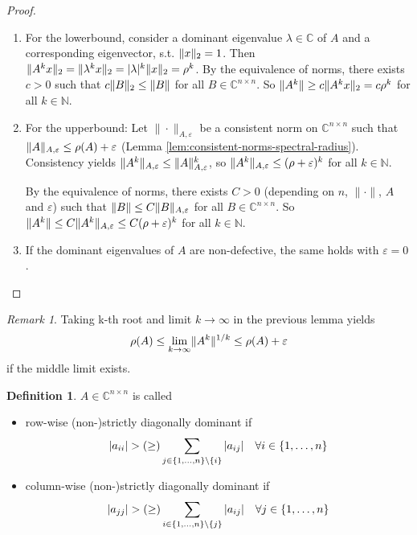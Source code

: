 \documentclass[12pt]{article}
\theoremstyle{definition}
\newtheorem{definition}[theorem]{Definition}
\theoremstyle{remark}
\newtheorem*{remark*}{Remark}
\numberwithin{equation}{section}
\newcommand{\C}{\mathbb{C}}
\newcommand{\N}{\mathbb{N}}
\newcommand{\normempty}{\|\cdot\|}
\DeclarePairedDelimiter{\norm}{\lVert}{\rVert}
\DeclarePairedDelimiter{\set}{\{}{\}}
\begin{document}
\begin{proof}
  \begin{enumerate}[label={(\roman*)}]
    \item For the lowerbound, consider a dominant eigenvalue $\lambda \in \C$ of $A$ and a corresponding eigenvector, s.t. $\norm{x}_2 = 1$. Then $\norm{A^kx}_2 = \norm{\lambda^k x}_2 = |\lambda|^k \norm{x}_2 = \rho^k$. By the equivalence of norms, there exists $c>0$ such that $c \norm{B}_2 \leq \norm{B}$ for all $B \in \C^{n \times n}$. So $\norm{A^k} \geq c \norm{A^kx}_2 = c \rho^k$ for all $k \in \N$.
    \item For the upperbound: Let $\normempty_{A,\varepsilon}$ be a consistent norm on $\C^{n \times n}$ such that $\norm{A}_{A,\varepsilon} \leq \rho(A) + \varepsilon$ (Lemma \ref{lem:consistent-norms-spectral-radius}). Consistency yields $\norm{A^k}_{A,\varepsilon} \leq \norm{A}_{A,\varepsilon}^k$, so $\norm{A^k}_{A,\varepsilon} \leq (\rho + \varepsilon)^k$ for all $k \in \N$.

      By the equivalence of norms, there exists $C>0$ (depending on $n$, $\normempty$, $A$ and $\varepsilon$) such that $\norm{B} \leq C \norm{B}_{A,\varepsilon}$ for all $B \in \C^{n \times n}$. So $\norm{A^k} \leq C \norm{A^k}_{A,\varepsilon} \leq C (\rho + \varepsilon)^k$ for all $k \in \N$.
    \item If the dominant eigenvalues of $A$ are non-defective, the same holds with $\varepsilon = 0$.
  \end{enumerate}
\end{proof}

\begin{remark*}
  Taking k-th root and limit $k \rightarrow \infty$ in the previous lemma yields
  \begin{equation*}
    \rho(A) \leq \lim_{k \rightarrow \infty} \norm{A^k}^{1/k} \leq \rho(A) + \varepsilon
  \end{equation*}
  if the middle limit exists.
\end{remark*}

\begin{definition}
  $A \in \C^{n \times n}$ is called
  \begin{itemize}
    \item row-wise (non-)strictly diagonally dominant if
      \begin{equation*}
        |a_{ii}| >(\geq) \sum_{j \in \set{1,\ldots,n} \setminus \set{i}}|a_{ij}| \quad \forall i
        \in \set{1,\ldots,n}
      \end{equation*}
    \item column-wise (non-)strictly diagonally dominant if
      \begin{equation*}
        |a_{jj}| >(\geq) \sum_{i \in \set{1,\ldots,n} \setminus \set{j}}|a_{ij}| \quad \forall j
        \in \set{1,\ldots,n}
      \end{equation*}
  \end{itemize}
\end{definition}
\end{document}
